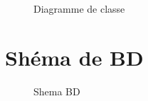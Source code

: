 \begin{figure}[hbt]
\centering
\right
\label{fig:Diagramme de classe}

 \caption{Diagramme de classe}
\end{figure}

\newpage
\section{Shéma de BD}
\newline

\begin{figure}[hbt]
\centering

\label{fig:Shema BD}

 \caption{Shema BD}
\end{figure}

